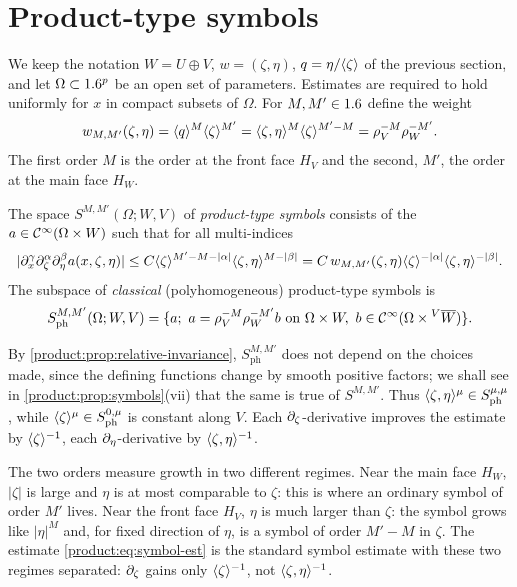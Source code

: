 \section{Product-type symbols}\label{product:sec:symbols}

We keep the notation $W=U\oplus V$, $w=(\zeta,\eta)$, $q=\eta/\langle \zeta\rangle$ of the
previous section, and let $\Omega\subset1.6^p$ be an open set of parameters.
Estimates are required to hold uniformly for $x$ in compact subsets of $\Omega$.
For $M,M'\in1.6$ define the weight
\begin{equation*}
w_{M,M'}(\zeta,\eta)=\langle q\rangle^{M}\langle \zeta\rangle^{M'}=\langle \zeta,\eta\rangle^{M}\langle \zeta\rangle^{M'-M}
=\rho_V^{-M}\rho_W^{-M'}.
\end{equation*}
The first order $M$ is the order at the front face $H_V$ and the second, $M'$,
the order at the main face $H_W$.

\begin{definition}\label{product:def:symbols}
The space $S^{M,M'}(\Omega;W,V)$ of \emph{product-type symbols} consists of the
$a\in\mathcal{C}^\infty(\Omega\times W)$ such that for all multi-indices
\begin{equation}\label{product:eq:symbol-est}
|\partial_x^\gamma\partial_\zeta^\alpha\partial_\eta^\beta a(x,\zeta,\eta)|\le
C\langle \zeta\rangle^{M'-M-|\alpha|}\langle \zeta,\eta\rangle^{M-|\beta|}
=C\,w_{M,M'}(\zeta,\eta)\langle \zeta\rangle^{-|\alpha|}\langle \zeta,\eta\rangle^{-|\beta|}.
\end{equation}
The subspace of \emph{classical} (polyhomogeneous) product-type symbols is
\begin{equation*}
S^{M,M'}_{\mathrm{ph}}(\Omega;W,V)=\{a;\ a=\rho_V^{-M}\rho_W^{-M'}b\ \text{on }
\Omega\times W,\ b\in\CI(\Omega\times\RelC VW)\}.
\end{equation*}
\end{definition}

By \cref{product:prop:relative-invariance}, $S^{M,M'}_{\mathrm{ph}}$ does not depend
on the choices made, since the defining functions change by smooth positive
factors; we shall see in \cref{product:prop:symbols}(vii) that the same is true of
$S^{M,M'}$. Thus $\langle \zeta,\eta\rangle^\mu\in S^{\mu,\mu}_{\mathrm{ph}}$, while
$\langle \zeta\rangle^\mu\in S^{0,\mu}_{\mathrm{ph}}$ is constant along $V$. Each
$\partial_\zeta$-derivative improves the estimate by $\langle \zeta\rangle^{-1}$, each
$\partial_\eta$-derivative by $\langle \zeta,\eta\rangle^{-1}$.

\begin{discussion}
  The two orders measure growth in two different regimes. Near the main face
  $H_W$, $|\zeta|$ is large and $\eta$ is at most comparable to $\zeta$: this is
  where an ordinary symbol of order $M'$ lives. Near the front face $H_V$, $\eta$
  is much larger than $\zeta$: the symbol grows like $|\eta|^M$ and, for fixed
  direction of $\eta$, is a symbol of order $M'-M$ in $\zeta$. The estimate
  \eqref{product:eq:symbol-est} is the standard symbol estimate with these two
  regimes separated: $\partial_\zeta$ gains only $\langle \zeta\rangle^{-1}$, not
  $\langle \zeta,\eta\rangle^{-1}$.
\end{discussion}

